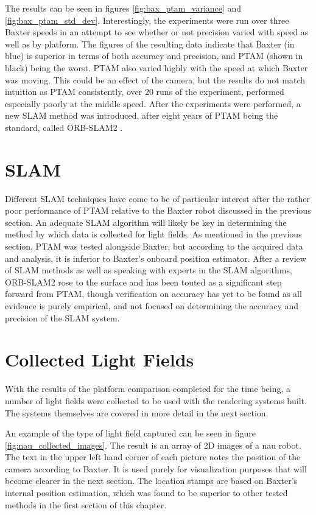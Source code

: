 \documentclass[12pt]{report}
\begin{document}
The results can be seen in figures \ref{fig:bax_ptam_variance} and \ref{fig:bax_ptam_std_dev}. Interestingly, the experiments were run over three Baxter speeds in an attempt to see whether or not precision varied with speed as well as by platform. The figures of the resulting data indicate that Baxter (in blue) is superior in terms of both accuracy and precision, and PTAM (shown in black) being the worst. PTAM also varied highly with the speed at which Baxter was moving. This could be an effect of the camera, but the results do not match intuition as PTAM consistently, over 20 runs of the experiment, performed especially poorly at the middle speed. After the experiments were performed, a new SLAM method was introduced, after eight years of PTAM being the standard, called ORB-SLAM2 \cite{Mur-Artal15}.

\section{SLAM}
Different SLAM techniques have come to be of particular interest after the rather poor performance of PTAM relative to the Baxter robot discussed in the previous section. An adequate SLAM algorithm will likely be key in determining the method by which data is collected for light fields. As mentioned in the previous section, PTAM was tested alongside Baxter, but according to the acquired data and analysis, it is inferior to Baxter's onboard position estimator. After a review of SLAM methods as well as speaking with experts in the SLAM algorithms, ORB-SLAM2 rose to the surface and has been touted as a significant step forward from PTAM, though verification on accuracy has yet to be found as all evidence is purely empirical, and not focused on determining the accuracy and precision of the SLAM system.

\section{Collected Light Fields}
With the results of the platform comparison completed for the time being, a number of light fields were collected to be used with the rendering systems built. The systems themselves are covered in more detail in the next section. 

An example of the type of light field captured can be seen in figure \ref{fig:nau_collected_images}. The result is an array of 2D images of a nau robot. The text in the upper left hand corner of each picture notes the position of the camera according to Baxter. It is used purely for visualization purposes that will become clearer in the next section. The location stamps are based on Baxter's internal position estimation, which was found to be superior to other tested methods in the first section of this chapter.
\end{document}
